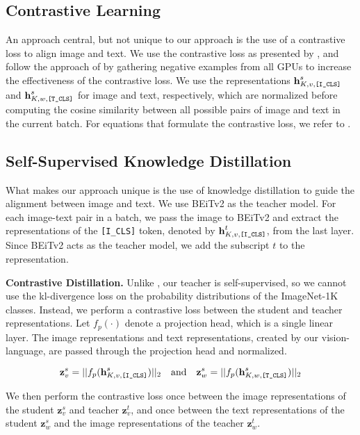 \documentclass[10pt]{article} %
\begin{document}
\subsection{Contrastive Learning}
An approach central, but not unique to our approach is the use of a contrastive loss to align image and text. We use the contrastive loss
as presented by \citet{clip}, and follow the approach of \citet{vlmo} by gathering negative examples from all GPUs to increase the
effectiveness of the contrastive loss. We use the representations $\textbf{h}^{s}_{K, v, \text{\texttt{[I\_CLS]}}}$ and
$\textbf{h}^{s}_{K, w, \text{\texttt{[T\_CLS]}}}$ for image and text, respectively, which are normalized before computing the cosine similarity
between all possible pairs of image and text in the current batch. For equations that formulate the contrastive loss, we refer to \citet{vlmo}.

\subsection{Self-Supervised Knowledge Distillation}
What makes our approach unique is the use of knowledge distillation to guide the alignment between image and text. 
We use BEiTv2 \citep{beitv2} as the teacher model. For each image-text pair in a batch, we pass the image to BEiTv2
and extract the representations of the \texttt{[I\_CLS]} token, denoted by
$\textbf{h}^{t}_{K, v, \text{\texttt{[I\_CLS]}}}$, from the last layer. Since BEiTv2 acts as the teacher model, we add the subscript $t$ to the
representation.

\textbf{Contrastive Distillation.} Unlike \cite{shre}, our teacher is self-supervised, so we cannot use the kl-divergence loss on the probability
distributions of the ImageNet-1K \citep{imagenet} classes. Instead, we perform a contrastive loss between the student and teacher representations.
Let $f_{p}(\cdot)$ denote a projection head, which is a single linear layer. The image representations and text representations,
created by our vision-language, are passed through the projection head and normalized.

\[
\textbf{z}^{s}_{v} = ||f_{p}(\textbf{h}^{s}_{K, v, \text{\texttt{[I\_CLS]}}})||_2 \quad \text{and} \quad \textbf{z}^{s}_{w} = ||f_{p}(\textbf{h}^{s}_{K, w, \text{\texttt{[T\_CLS]}}})||_2
\]

We then perform the contrastive loss once between the image representations of the student $\textbf{z}^{s}_{v}$ and teacher $\textbf{z}^{t}_{v}$,
and once between the text representations of the student $\textbf{z}^{s}_{w}$ and the image representations of the teacher $\textbf{z}^{t}_{w}$.
\end{document}
